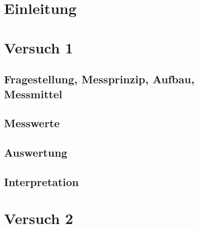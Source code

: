 \documentclass[12pt,oneside,a4paper]{report}
\begin{document}




\clearpage

%
%


%
%


%
%


%
%




\setcounter{page}{1}
%
%
\chapter{Einleitung}
\label{chap:EINL}

\cite{Franz2015j}

%
%
\chapter{Versuch 1}
\label{chap:VERSUCH_1}

\section{Fragestellung, Messprinzip, Aufbau, Messmittel}
\label{chap:VERSUCH_1_FRAGESTELLUNG}

\section{Messwerte}
\label{chap:VERSUCH_1_MESSWERTE}

\section{Auswertung}
\label{chap:VERSUCH_1_AUSWERTUNG}

\section{Interpretation}
\label{chap:VERSUCH_1_INTERPRETATION}

%
%
\chapter{Versuch 2}
\label{chap:VERSUCH_2}
\end{document}

